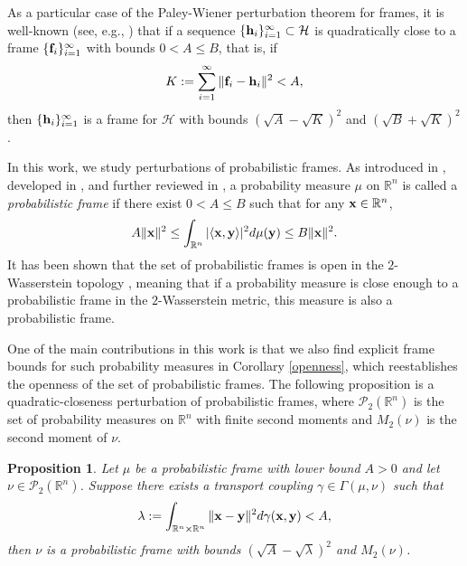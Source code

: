 \documentclass{amsart}
\numberwithin{equation}{section}
\theoremstyle{plain}
\newtheorem{proposition}[theorem]{Proposition}
\theoremstyle{definition}
\begin{document}
As a particular case of the Paley-Wiener perturbation theorem for frames, it is well-known (see, e.g.,  \cite{christensen1995frame}) that if a sequence $\{{\bf h}_i\}_{i=1}^\infty \subset \mathcal{H}$ is quadratically close to a frame $\{{\bf f}_i\}_{i=1}^\infty$ with bounds $0<A \leq B$, that is, if
$$K:=\sum\limits_{i=1}^\infty  \Vert  {\bf f}_i-{\bf h}_i  \Vert^2 < A,$$
then $\{{\bf h}_i\}_{i=1}^\infty$ is a frame for $\mathcal{H}$ with bounds $(\sqrt{A}-\sqrt{K})^2$ and $(\sqrt{B}+\sqrt{K})^2$. 

In this work, we study perturbations of probabilistic frames. As introduced in \cite{ehler2012random}, developed in \cite{ehler2012minimization}, and further reviewed in \cite{ehler2013probabilistic}, a probability measure $\mu$ on $\mathbb{R}^n$ is called a \textit{probabilistic frame} if there exist $0<A \leq B$ such that for any ${\bf x} \in \mathbb{R}^n$, 
\begin{equation*}
    A \Vert {\bf x }  \Vert^2 \leq \int_{\mathbb{R}^n} \vert \langle {\bf x},{\bf y} \rangle \vert ^2 d\mu({\bf y})  \leq B\Vert {\bf x}  \Vert^2.
\end{equation*}
It has been shown that the set of probabilistic frames is open in the $2$-Wasserstein topology \cite{chen2025probabilistic}, meaning that if a probability measure is close enough to a probabilistic frame in the $2$-Wasserstein metric, this measure is also a probabilistic frame. 

One of the main contributions in this work is that we also find explicit frame bounds for such probability measures in Corollary \ref{openness}, which reestablishes the openness of the set of probabilistic frames. The following proposition is a quadratic-closeness perturbation of probabilistic frames, where $\mathcal{P}_2(\mathbb{R}^n)$ is the set of probability measures on $\mathbb{R}^n$ with finite second moments and $M_2(\nu)$ is the second moment of $\nu$.   
\begin{proposition} \label{QuadClose}
Let $\mu$ be a probabilistic frame with lower bound  $A>0$ and let $\nu \in \mathcal{P}_2(\mathbb{R}^n)$. Suppose there exists a transport coupling $\gamma \in \Gamma(\mu, \nu)$ such that
\begin{equation*}
   \lambda:= \int_{\mathbb{R}^n  \times \mathbb{R}^n} \Vert {\bf x}-{\bf y} \Vert^2  d \gamma({\bf x}, {\bf y}) < A,
\end{equation*}
then $\nu$ is a probabilistic frame with bounds $(\sqrt{A}-\sqrt{\lambda})^2 $ and $M_2(\nu)$. 
\end{proposition}
\end{document}
